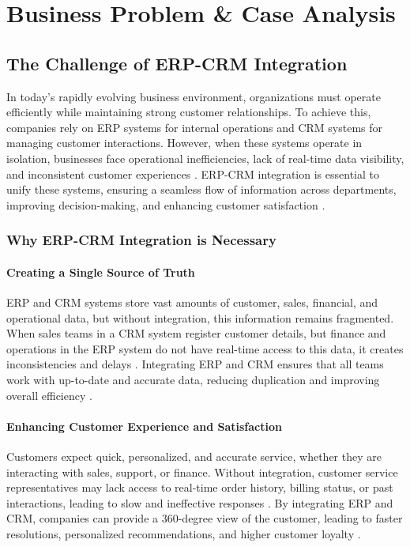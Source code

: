 
\chapter{Business Problem \& Case Analysis}
\section{The Challenge of ERP-CRM Integration}

In today’s rapidly evolving business environment, organizations must operate efficiently while maintaining strong customer relationships. To achieve this, companies rely on ERP systems for internal operations and CRM systems for managing customer interactions. However, when these systems operate in isolation, businesses face operational inefficiencies, lack of real-time data visibility, and inconsistent customer experiences \cite{ruivo2014}. ERP-CRM integration is essential to unify these systems, ensuring a seamless flow of information across departments, improving decision-making, and enhancing customer satisfaction \cite{shaul2013}.

\subsection{Why ERP-CRM Integration is Necessary}

\subsubsection{Creating a Single Source of Truth}
ERP and CRM systems store vast amounts of customer, sales, financial, and operational data, but without integration, this information remains fragmented. When sales teams in a CRM system register customer details, but finance and operations in the ERP system do not have real-time access to this data, it creates inconsistencies and delays \cite{hendricks2007}. Integrating ERP and CRM ensures that all teams work with up-to-date and accurate data, reducing duplication and improving overall efficiency \cite{gebreyes2018}.

\subsubsection{Enhancing Customer Experience and Satisfaction}
Customers expect quick, personalized, and accurate service, whether they are interacting with sales, support, or finance. Without integration, customer service representatives may lack access to real-time order history, billing status, or past interactions, leading to slow and ineffective responses \cite{devarashetty2023}. By integrating ERP and CRM, companies can provide a 360-degree view of the customer, leading to faster resolutions, personalized recommendations, and higher customer loyalty \cite{mestre2015}.

